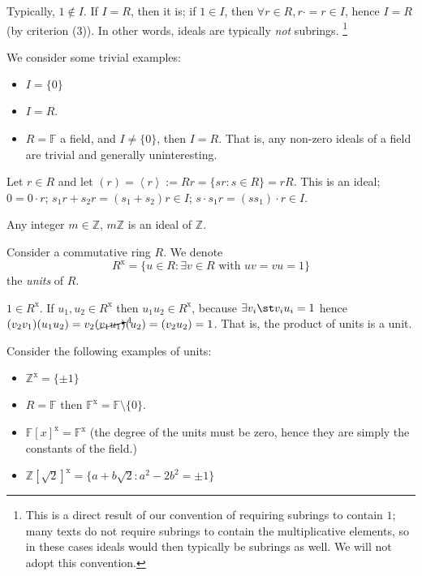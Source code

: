 \documentclass[12pt,oneside]{article}
\begin{document}
\begin{remark}
  Typically, $1 \notin I$. If $I = R$, then it is; if $1 \in I$, then $\forall r \in R, r \cdot = r \in I$, hence $I = R$ (by criterion (3)). In other words, ideals are typically \emph{not} subrings. \footnote{This is a direct result of our convention of requiring subrings to contain $1$; many texts do not require subrings to contain the multiplicative elements, so in these cases ideals would then typically be subrings as well. We will not adopt this convention.}
\end{remark}

\begin{example}
  We consider some trivial examples:
  \begin{itemize}
    \item $I = \{0\}$
    \item $I = R$. 
    \item $R = \mathbb{F}$ a field, and $I \neq \{0\}$, then $I = R$. That is, any non-zero ideals of a field are trivial and generally uninteresting.
  \end{itemize}
\end{example}

\begin{definition}
  Let $r \in R$ and let $(r) = \left\langle r\right\rangle := Rr = \{sr : s \in R\} = r R$. This is an ideal; $0 = 0 \cdot r$; $s_1 r + s_2 r = (s_1 + s_2)r \in I$; $s\cdot s_1 r = (s s_1)\cdot r \in I$.
\end{definition}

\begin{example}
  Any integer $m \in \mathbb{Z}$, $m \mathbb{Z}$ is an ideal of $\mathbb{Z}$.
\end{example}

\begin{definition}[Units of R]
  Consider a commutative ring $R$. We denote \[
  R^{\text{x}} = \{u \in R : \exists v \in R \text{ with } uv = vu = 1\}  
  \]
  the \emph{units} of $R$.
\end{definition}

\begin{remark}
  $1 \in R^{\text{x}}$. If $u_1, u_2 \in R^{\text{x}}$ then $u_1u_2 \in R^{\text{x}}$, because $\exists v_i \st v_i u_i = 1$ hence $(v_2 v_1) (u_1 u_2) = v_2(\cancelto{1}{v_1u_1})(u_2) = (v_2u_2)=1$. That is, the product of units is a unit.
\end{remark}
\begin{example}
  Consider the following examples of units:
  \begin{itemize}
    \item $\mathbb{Z}^{\text{x}} = \{\pm 1\}$
    \item $R = \mathbb{F}$ then $\mathbb{F}^{\text{x}} = \mathbb{F}\setminus \{0\}$.
    \item $\mathbb{F}[x]^\text{x} = \mathbb{F}^{\text{x}}$ (the degree of the units must be zero, hence they are simply the constants of the field.)
    \item $\mathbb{Z}[\sqrt{2}]^{\text{x}} = \{a + b\sqrt{2} : a^2 - 2b^2 = \pm 1\}$\footnotemark
  \end{itemize}
\end{example}
\end{document}
